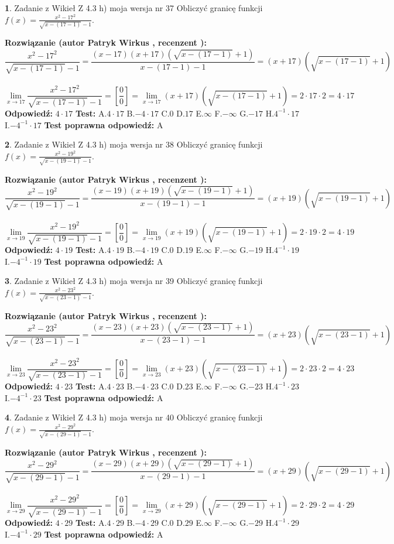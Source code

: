 \documentclass[12pt, a4paper]{article}
\theoremstyle{definition} %
\newtheorem{zad}{}
\newcommand{\zadStart}[1]{\begin{zad}#1\newline}
\newcommand{\zadStop}{\end{zad}}
\newcommand{\rozwStart}[2]{\noindent \textbf{Rozwiązanie (autor #1 , recenzent #2): }\newline}
\newcommand{\rozwStop}{\newline}
\newcommand{\odpStart}{\noindent \textbf{Odpowiedź:}\newline}
\newcommand{\odpStop}{\newline}
\newcommand{\testStart}{\noindent \textbf{Test:}\newline}
\newcommand{\testStop}{\newline}
\newcommand{\kluczStart}{\noindent \textbf{Test poprawna odpowiedź:}\newline}
\newcommand{\kluczStop}{\newline}
\begin{document}
\zadStart{Zadanie z Wikieł Z 4.3 h) moja wersja nr 37}
Obliczyć granicę funkcji $f(x)=\frac{x^{2} - 17^{2}}{\sqrt{x-(17-1)}-1}$.
\zadStop
\rozwStart{Patryk Wirkus}{}
$$\frac{x^{2} - 17^{2}}{\sqrt{x-(17-1)}-1}=\frac{(x-17)(x+17)(\sqrt{x-(17-1)}+1)}{x-(17-1)-1}=(x+17)(\sqrt{x-(17-1)}+1)$$
\\
$$\lim\limits_{x\to 17}\frac{x^{2} - 17^{2}}{\sqrt{x-(17-1)}-1}=[\frac{0}{0}]=
\lim\limits_{x\to 17}(x+17)(\sqrt{x-(17-1)}+1) = 2\cdot17 \cdot 2 = 4 \cdot 17$$
\rozwStop
\odpStart
$4\cdot17$
\odpStop
\testStart
A.$4\cdot17$
B.$-4\cdot17$
C.$0$
D.$17$
E.$\infty$
F.$-\infty$
G.$-17$
H.$4^{-1}\cdot17$
I.$-4^{-1}\cdot17$
\testStop
\kluczStart
A
\kluczStop



\zadStart{Zadanie z Wikieł Z 4.3 h) moja wersja nr 38}
Obliczyć granicę funkcji $f(x)=\frac{x^{2} - 19^{2}}{\sqrt{x-(19-1)}-1}$.
\zadStop
\rozwStart{Patryk Wirkus}{}
$$\frac{x^{2} - 19^{2}}{\sqrt{x-(19-1)}-1}=\frac{(x-19)(x+19)(\sqrt{x-(19-1)}+1)}{x-(19-1)-1}=(x+19)(\sqrt{x-(19-1)}+1)$$
\\
$$\lim\limits_{x\to 19}\frac{x^{2} - 19^{2}}{\sqrt{x-(19-1)}-1}=[\frac{0}{0}]=
\lim\limits_{x\to 19}(x+19)(\sqrt{x-(19-1)}+1) = 2\cdot19 \cdot 2 = 4 \cdot 19$$
\rozwStop
\odpStart
$4\cdot19$
\odpStop
\testStart
A.$4\cdot19$
B.$-4\cdot19$
C.$0$
D.$19$
E.$\infty$
F.$-\infty$
G.$-19$
H.$4^{-1}\cdot19$
I.$-4^{-1}\cdot19$
\testStop
\kluczStart
A
\kluczStop



\zadStart{Zadanie z Wikieł Z 4.3 h) moja wersja nr 39}
Obliczyć granicę funkcji $f(x)=\frac{x^{2} - 23^{2}}{\sqrt{x-(23-1)}-1}$.
\zadStop
\rozwStart{Patryk Wirkus}{}
$$\frac{x^{2} - 23^{2}}{\sqrt{x-(23-1)}-1}=\frac{(x-23)(x+23)(\sqrt{x-(23-1)}+1)}{x-(23-1)-1}=(x+23)(\sqrt{x-(23-1)}+1)$$
\\
$$\lim\limits_{x\to 23}\frac{x^{2} - 23^{2}}{\sqrt{x-(23-1)}-1}=[\frac{0}{0}]=
\lim\limits_{x\to 23}(x+23)(\sqrt{x-(23-1)}+1) = 2\cdot23 \cdot 2 = 4 \cdot 23$$
\rozwStop
\odpStart
$4\cdot23$
\odpStop
\testStart
A.$4\cdot23$
B.$-4\cdot23$
C.$0$
D.$23$
E.$\infty$
F.$-\infty$
G.$-23$
H.$4^{-1}\cdot23$
I.$-4^{-1}\cdot23$
\testStop
\kluczStart
A
\kluczStop



\zadStart{Zadanie z Wikieł Z 4.3 h) moja wersja nr 40}
Obliczyć granicę funkcji $f(x)=\frac{x^{2} - 29^{2}}{\sqrt{x-(29-1)}-1}$.
\zadStop
\rozwStart{Patryk Wirkus}{}
$$\frac{x^{2} - 29^{2}}{\sqrt{x-(29-1)}-1}=\frac{(x-29)(x+29)(\sqrt{x-(29-1)}+1)}{x-(29-1)-1}=(x+29)(\sqrt{x-(29-1)}+1)$$
\\
$$\lim\limits_{x\to 29}\frac{x^{2} - 29^{2}}{\sqrt{x-(29-1)}-1}=[\frac{0}{0}]=
\lim\limits_{x\to 29}(x+29)(\sqrt{x-(29-1)}+1) = 2\cdot29 \cdot 2 = 4 \cdot 29$$
\rozwStop
\odpStart
$4\cdot29$
\odpStop
\testStart
A.$4\cdot29$
B.$-4\cdot29$
C.$0$
D.$29$
E.$\infty$
F.$-\infty$
G.$-29$
H.$4^{-1}\cdot29$
I.$-4^{-1}\cdot29$
\testStop
\kluczStart
A
\kluczStop
\end{document}
